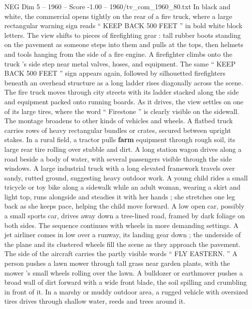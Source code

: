 \begin{textsample}{NEG Dim 5 – 1960 – Score -1.00 – 1960/tv\_com\_1960\_80.txt}  \label{ex:f5_neg_049}
In black and white, the commercial opens tightly on the rear of a fire truck, where a large rectangular warning sign reads “ KEEP BACK 500 FEET ” in bold white block letters.
The view shifts to pieces of firefighting gear : tall rubber boots standing on the pavement as someone steps into them and pulls at the tops, then helmets and tools hanging from the side of a fire engine.
A firefighter climbs onto the truck ’s side step near metal valves, hoses, and equipment.
The same “ KEEP BACK 500 FEET ” sign appears again, followed by silhouetted firefighters beneath an overhead structure as a long ladder rises diagonally across the scene.
The fire truck moves through city streets with its ladder stacked along the side and equipment packed onto running boards.
As it drives, the view settles on one of its large tires, where the word “ Firestone ” is clearly visible on the sidewall.
The montage broadens to other kinds of vehicles and wheels.
A flatbed truck carries rows of heavy rectangular bundles or crates, secured between upright stakes.
In a rural field, a tractor pulls \textbf{farm} equipment through rough soil, its large rear tire rolling over stubble and dirt.
A long station wagon drives along a road beside a body of water, with several passengers visible through the side windows.
A large industrial truck with a long elevated framework travels over sandy, rutted ground, suggesting heavy outdoor work.
A young child rides a small tricycle or toy bike along a sidewalk while an adult woman, wearing a skirt and light top, runs alongside and steadies it with her hands ; she stretches one leg back as she keeps pace, helping the child move forward.
A low open car, possibly a small sports car, drives away down a tree-lined road, framed by dark foliage on both sides.
The sequence continues with wheels in more demanding settings.
A jet airliner comes in low over a runway, its landing gear down ; the underside of the plane and its clustered wheels fill the scene as they approach the pavement.
The side of the aircraft carries the partly visible words “ FLY EASTERN. ” A person pushes a lawn mower through tall grass near garden plants, with the mower ’s small wheels rolling over the lawn.
A bulldozer or earthmover pushes a broad wall of dirt forward with a wide front blade, the soil spilling and crumbling in front of it.
In a marshy or muddy outdoor area, a rugged vehicle with oversized tires drives through shallow water, reeds and trees around it.

\end{textsample}
